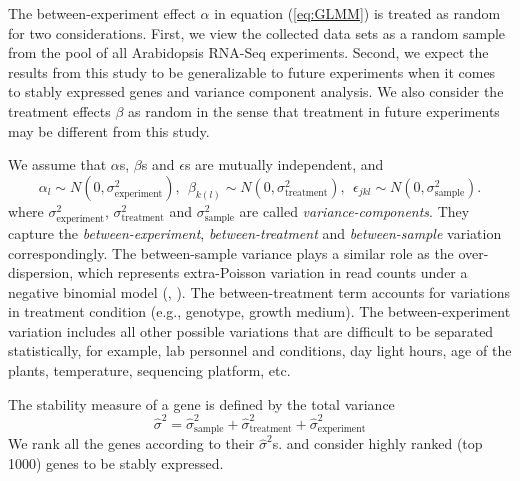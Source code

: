 \documentclass[11pt, a4paper]{article}
\begin{document}
The between-experiment effect $\alpha$ in equation (\ref{eq:GLMM}) is treated as random for two considerations. First, we view the collected data sets as a random sample from the pool of all Arabidopsis RNA-Seq experiments. Second, we expect the results from this study to be generalizable to future experiments when it comes to stably expressed genes and variance component analysis.
We also consider the treatment effects $\beta$ as random 
in the sense that treatment in future experiments may be different from this study.

We assume that $\alpha$s, $\beta$s and $\epsilon$s are mutually independent, and  
  \[\alpha_l\sim N(0, \sigma^2_{\text{experiment}}),~~
  \beta_{k(l)}\sim N(0, \sigma^2_{\text{treatment}}),~~
  \epsilon_{jkl}\sim N(0, \sigma_{\text{sample}}^2).\]
where $\sigma_{\text{experiment}}^2$, $\sigma_{\text{treatment}}^2$ and $\sigma_{\text{sample}}^2$  are called \textit{variance-components}. They capture the
\textit{between-experiment}, \textit{between-treatment} and \textit{between-sample} variation
correspondingly. The between-sample variance plays a similar role as the over-dispersion, which represents extra-Poisson variation in read counts under a negative binomial model (\cite{anders2010differential}, \cite{di2011nbp}).  The between-treatment term accounts for variations in treatment condition (e.g., genotype, growth medium). 
The between-experiment variation includes all other possible variations that are difficult to be separated statistically, for example, lab personnel and conditions, day light hours, age of the plants, temperature, sequencing platform, etc.

The stability measure of a gene is defined by the total variance
 \begin{equation}\label{eq:totalVariance}
 \hat \sigma^2 =\hat\sigma_{\text{sample}}^2+ \hat\sigma_{\text{treatment}}^2+ \hat\sigma_{\text{experiment}}^2
 \end{equation}
We rank all the genes according to their $\hat\sigma^2$s. and consider highly ranked (top 1000) genes to be stably expressed. 
\end{document}
